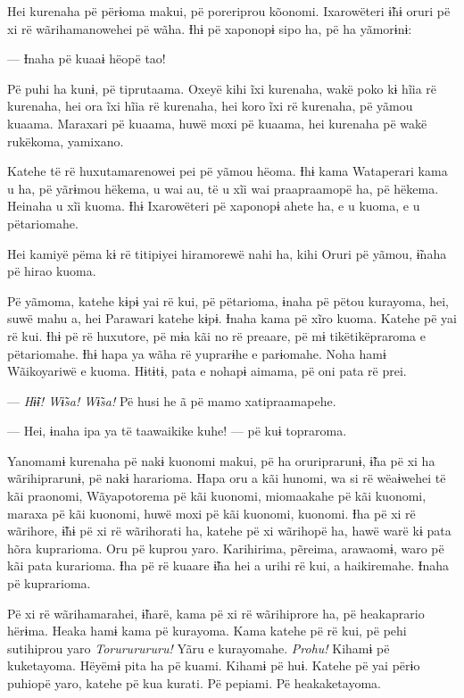 Hei kurenaha pë përɨoma makui, pë poreriprou kõonomi. Ixarowëteri ɨ̃hɨ
oruri pë xi rë wãrihamanowehei pë wãha. Ɨhɨ pë xaponopɨ sipo ha, pë ha
yãmorɨnɨ: 

--- Ɨnaha pë kuaaɨ hëopë tao! 

Pë puhi ha kunɨ, pë tiprutaama. Oxeyë kihi ĩxi kurenaha, wakë poko kɨ
hĩia rë kurenaha, hei ora ĩxi hĩia rë kurenaha, hei koro ĩxi rë
kurenaha, pë yãmou kuaama. Maraxari pë kuaama, huwë moxi pë kuaama, hei
kurenaha pë wakë rukëkoma, yamixano. 

Katehe të rë huxutamarenowei pei pë yãmou hëoma. Ɨhɨ kama Wataperari
kama u ha, pë yãrɨmou hëkema, u wai au, të u xĩi wai praapraamopë ha, pë
hëkema. Heinaha u xĩi kuoma. Ɨhɨ Ixarowëteri pë xaponopɨ ahete ha, e u
kuoma, e u pëtariomahe. 

Hei kamiyë pëma kɨ rë titipiyei hiramorewë nahi ha, kihi Oruri pë yãmou,
ɨ̃naha pë hirao kuoma. 

Pë yãmoma, katehe kɨpɨ yai rë kui, pë pëtarioma, ɨnaha pë pëtou
kurayoma, hei, suwë mahu a, hei Parawari katehe kɨpɨ. Ɨnaha kama pë xĩro
kuoma. Katehe pë yai rë kui. Ɨhɨ pë rë huxutore, pë mɨa kãi no rë
preaare, pë mɨ tikëtikëpraroma e pëtariomahe. Ɨhɨ hapa ya wãha rë
yuprarɨhe e parɨomahe. Noha hamɨ Wãikoyariwë e kuoma. Hɨtɨtɨ, pata e
nohapɨ aimama, pë oni pata rë prei. 

--- \textit{Hɨ̃ɨ! Wɨ̃sa! Wɨ̃sa! }Pë husi he ã pë mamo xatipraamapehe. 

--- Hei, ɨnaha ipa ya të taawaikike kuhe! --- pë kuɨ topraroma. 

Yanomamɨ kurenaha pë nakɨ kuonomi makui, pë ha oruriprarunɨ, ɨ̃ha pë xi
ha wãrihiprarunɨ, pë nakɨ hararioma. Hapa oru a kãi hunomi, wa si rë
wëaɨwehei të kãi praonomi, Wãyapotorema pë kãi kuonomi, miomaakahe pë
kãi kuonomi, maraxa pë kãi kuonomi, huwë moxi pë kãi kuonomi, kuonomi.
Ɨha pë xi rë wãrihore, ɨ̃hɨ pë xi rë wãrihorati ha, katehe pë xi wãrihopë
ha, hawë warë kɨ pata hõra kuprarioma. Oru pë kuprou yaro. Karihirima,
pẽreima, arawaomɨ, waro pë kãi pata kurarioma. Ɨha pë rë kuaare ɨ̃ha hei
a urihi rë kui, a haikiremahe. Ɨnaha pë kuprarioma. 

Pë xi rë wãrihamarahei, ɨ̃harë, kama pë xi rë wãrihiprore ha, pë
heakaprario hërɨma. Heaka hamɨ kama pë kurayoma. Kama katehe pë rë kui,
pë pehi sutihiprou yaro \textit{Torururururu!} Yãru e kurayomahe. \textit{Prohu!} Kihamɨ
pë kuketayoma. Hëyëmɨ pita ha pë kuami. Kihamɨ pë huɨ. Katehe pë yai
përɨo puhiopë yaro, katehe pë kua kurati. Pë pepiami. Pë heakaketayoma. 

